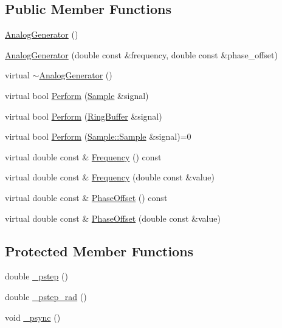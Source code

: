 \subsection*{Public Member Functions}
\begin{DoxyCompactItemize}
\item 
\hyperlink{classDSG_1_1AnalogGenerator_a361c75a897c8984cd283bae8bdfd152e}{Analog\+Generator} ()
\item 
\hyperlink{classDSG_1_1AnalogGenerator_a13c3745554321cd94bc3121160641f4e}{Analog\+Generator} (double const \&frequency, double const \&phase\+\_\+offset)
\item 
virtual \hyperlink{classDSG_1_1AnalogGenerator_ae180f86033e38d3a5fcd8caecfb518e8}{$\sim$\+Analog\+Generator} ()
\item 
virtual bool \hyperlink{classDSG_1_1AnalogGenerator_ac50033964304239b514b7ee9d064bc75}{Perform} (\hyperlink{classDSG_1_1Sample}{Sample} \&signal)
\item 
virtual bool \hyperlink{classDSG_1_1AnalogGenerator_a1b4f1d4af926fcc3e9571db7960c8706}{Perform} (\hyperlink{classDSG_1_1RingBuffer}{Ring\+Buffer} \&signal)
\item 
virtual bool \hyperlink{classDSG_1_1SignalProcess_afdb8220100418893950c1161dd24db67}{Perform} (\hyperlink{classDSG_1_1Sample_aaf2e30d73911eccea99b53eeee15b612}{Sample\+::\+Sample} \&signal)=0
\item 
virtual double const \& \hyperlink{classDSG_1_1SignalGenerator_aedac746c5a70818d120858542ecb7c45}{Frequency} () const 
\item 
virtual double const \& \hyperlink{classDSG_1_1SignalGenerator_ae3ce8d45bafabbd86a0f535b15c3cd46}{Frequency} (double const \&value)
\item 
virtual double const \& \hyperlink{classDSG_1_1SignalGenerator_a1ce521847edd0b837fd840998f906b4b}{Phase\+Offset} () const 
\item 
virtual double const \& \hyperlink{classDSG_1_1SignalGenerator_a08b71b1f30ba65e629642c570291dc0e}{Phase\+Offset} (double const \&value)
\end{DoxyCompactItemize}
\subsection*{Protected Member Functions}
\begin{DoxyCompactItemize}
\item 
double \hyperlink{classDSG_1_1SignalGenerator_ac0d781b8673b3a283bf7c133290ede50}{\+\_\+pstep} ()
\item 
double \hyperlink{classDSG_1_1SignalGenerator_ae660eb4caa88b8d278f8d24d0908a487}{\+\_\+pstep\+\_\+rad} ()
\item 
void \hyperlink{classDSG_1_1SignalGenerator_a05baccb38d1e52860d4fcf7cb8430efc}{\+\_\+psync} ()
\end{DoxyCompactItemize}
